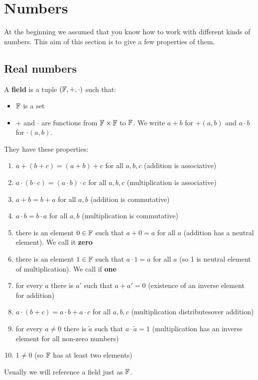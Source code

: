 \section{Numbers}

At the beginning we assumed that you know how to work with different kinds of numbers. This aim of this section is to give a few properties of them.

\subsection{Real numbers}
\begin{definition}
  A \textbf{field} is a tuple $(\mathbb F, +, \cdot)$ such that:
  \begin{itemize}
    \item $\mathbb F$ is a set
    \item $+$ and $\cdot$ are functions from $\mathbb F\times \mathbb F$ to $\mathbb F$. We write
      $a+b$ for $+(a,b)$ and $a\cdot b$ for $\cdot (a,b)$.
  \end{itemize}
  They have these properties:
  \begin{enumerate}
    \item $a+(b+c)=(a+b)+c$ for all $a,b,c$ (addition is associative)
    \item $a\cdot (b\cdot c)=(a\cdot b)\cdot c$ for all $a,b,c$ (multiplication is associative)
    \item $a+b=b+a$ for all $a, b$ (addition is commutative)
    \item $a\cdot b=b\cdot a$ for all $a,b$ (multiplication is commutative)
    \item there is an element $0\in\mathbb F$ such that $a+0=a$ for all $a$ (addition has a neutral element). We call it \textbf{zero}
    \item there is an element $1\in\mathbb F$ such that $a\cdot 1=a$ for all $a$ (so 1 is neutral element of multiplication). We call if \textbf{one}
    \item for every $a$ there is $a'$ such that $a+a'=0$ (existence of
      an inverse element for addition)
    \item $a\cdot (b+c) = a\cdot b + a\cdot c$ for all $a,b, c$
      (multiplication distributesover addition)
    \item for every $a\neq 0$ there is $\tilde a$ such that $a\cdot \tilde a=1$
      (multiplication has an inverse element for all non-zero numbers)
    \item $1\neq 0$ (so $\mathbb F$ has at least two elements)
  \end{enumerate}

  Usually we will reference a field just as $\mathbb F$.
\end{definition}

